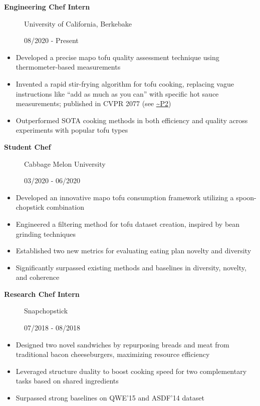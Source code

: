 \documentclass[
]{article}
\providecommand{\tightlist}{%
  \setlength{\itemsep}{0pt}\setlength{\parskip}{0pt}}
\begin{document}
\begin{description}
\item[\textbf{Engineering Chef Intern}]
University of California, Berkebake

08/2020 - Present
\end{description}

\begin{itemize}
\tightlist
\item
  Developed a precise mapo tofu quality assessment technique using
  thermometer-based measurements
\item
  Invented a rapid stir-frying algorithm for tofu cooking, replacing
  vague instructions like ``add as much as you can'' with specific hot
  sauce measurements; published in CVPR 2077 (see
  \href{**You\%20Only\%20Cook\%20Once:\%20Unified,\%20Real-Time\%20Mapo\%20Tofu\%20Recipe**}{\textasciitilde P2})
\item
  Outperformed SOTA cooking methods in both efficiency and quality
  across experiments with popular tofu types
\end{itemize}

\begin{description}
\item[\textbf{Student Chef}]
Cabbage Melon University

03/2020 - 06/2020
\end{description}

\begin{itemize}
\tightlist
\item
  Developed an innovative mapo tofu consumption framework utilizing a
  spoon-chopstick combination
\item
  Engineered a filtering method for tofu dataset creation, inspired by
  bean grinding techniques
\item
  Established two new metrics for evaluating eating plan novelty and
  diversity
\item
  Significantly surpassed existing methods and baselines in diversity,
  novelty, and coherence
\end{itemize}

\begin{description}
\item[\textbf{Research Chef Intern}]
Snapchopstick

07/2018 - 08/2018
\end{description}

\begin{itemize}
\tightlist
\item
  Designed two novel sandwiches by repurposing breads and meat from
  traditional bacon cheeseburgers, maximizing resource efficiency
\item
  Leveraged structure duality to boost cooking speed for two
  complementary tasks based on shared ingredients
\item
  Surpassed strong baselines on QWE'15 and ASDF'14 dataset
\end{itemize}
\end{document}
